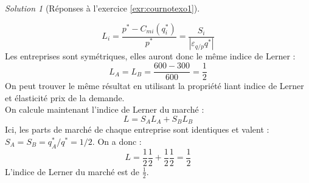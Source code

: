 \documentclass[
]{book}
\theoremstyle{definition}
\theoremstyle{definition}
\theoremstyle{definition}
\theoremstyle{definition}
\theoremstyle{remark}
\newtheorem*{solution}{Solution}
\begin{document}
\begin{solution}[Réponses à l'exercice \ref{exr:cournotexo1}]
\begin{enumerate}
  \[L_i=\frac{p^*-C_{mi}(q_i^*)}{p^*}=\frac{S_i}{|\varepsilon_{q/p}{q^*}|}\]
  Les entreprises sont symétriques, elles auront donc le même indice de Lerner :
  \[L_A=L_B=\frac{600-300}{600}=\frac{1}{2}\]
  On peut trouver le même résultat en utilisant la propriété liant indice de Lerner et élasticité prix de la demande.\\
  On calcule maintenant l'indice de Lerner du marché :
  \[L=S_AL_A+S_BL_B\]
  Ici, les parts de marché de chaque entreprise sont identiques et valent : \(S_A=S_B=q_A^*/q^*=1/2\).
  On a donc :
  \[L=\frac{1}{2}\frac{1}{2}+\frac{1}{2}\frac{1}{2}=\frac{1}{2}\]
  L'indice de Lerner du marché est de \(\frac{1}{2}\).
\end{enumerate}

\end{solution}
\end{document}
